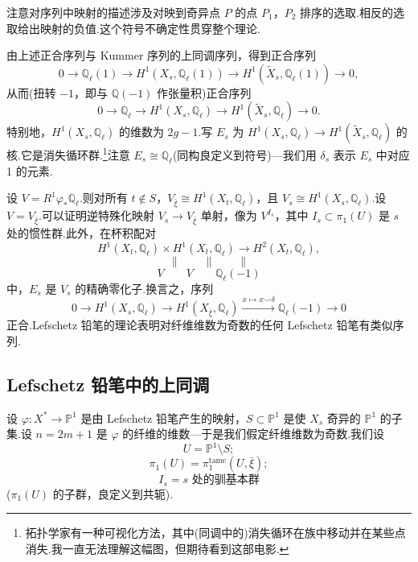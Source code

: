 注意对序列中映射的描述涉及对映到奇异点 $P$ 的点 $P_1$，$P_2$ 排序的选取.相反的选取给出映射的负值.这个符号不确定性贯穿整个理论.

由上述正合序列与 Kummer 序列的上同调序列，得到正合序列
\[
0 \to \mathbb{Q}_{\ell}(1) \to H^{1}(X_s, \mathbb{Q}_{\ell}(1)) \to H^{1}(\widetilde{X}_s, \mathbb{Q}_{\ell}(1)) \to 0,
\]
从而(扭转 $-1$，即与 $\mathbb{Q}(-1)$ 作张量积)正合序列
\[
0 \to \mathbb{Q}_{\ell} \to H^{1}(X_s, \mathbb{Q}_{\ell}) \to H^{1}(\widetilde{X}_s, \mathbb{Q}_{\ell}) \to 0.
\]
特别地，$H^{1}(X_s, \mathbb{Q}_{\ell})$ 的维数为 $2g - 1$.写 $E_s$ 为 $H^{1}(X_s, \mathbb{Q}_{\ell}) \to H^{1}(\widetilde{X}_s, \mathbb{Q}_{\ell})$ 的核.它是消失循环群.\footnote{拓扑学家有一种可视化方法，其中(同调中的)消失循环在族中移动并在某些点消失.我一直无法理解这幅图，但期待看到这部电影.}注意 $E_s \cong \mathbb{Q}_{\ell}$(同构良定义到符号)---我们用 $\delta_s$ 表示 $E_s$ 中对应 1 的元素.

设 $V = R^{1}\varphi_{*}\mathbb{Q}_{\ell}$.则对所有 $t \notin S$，$V_{\bar{\xi}} \cong H^{1}(X_t, \mathbb{Q}_{\ell})$，且 $V_s \cong H^{1}(X_s, \mathbb{Q}_{\ell})$.设 $V = V_{\bar{\xi}}$.可以证明逆特殊化映射 $V_s \to V_{\bar{\xi}}$ 单射，像为 $V^{I_s}$，其中 $I_s \subset \pi_1(U)$ 是 $s$ 处的惯性群.此外，在杯积配对
\[
H^{1}(X_t, \mathbb{Q}_{\ell}) \times H^{1}(X_t, \mathbb{Q}_{\ell}) \to H^{2}(X_t, \mathbb{Q}_{\ell}),
\]
\[
\parallel \qquad \parallel \qquad \parallel
\]
\[
V \qquad V \qquad \mathbb{Q}_{\ell}(-1)
\]
中，$E_s$ 是 $V_s$ 的精确零化子.换言之，序列
\[
0 \to H^{1}(X_s, \mathbb{Q}_{\ell}) \to H^{1}(X_{\bar{\xi}}, \mathbb{Q}_{\ell}) \xrightarrow{x \mapsto x \smile \delta} \mathbb{Q}_{\ell}(-1) \to 0
\]
正合.Lefschetz 铅笔的理论表明对纤维维数为奇数的任何 Lefschetz 铅笔有类似序列.

\subsection*{Lefschetz 铅笔中的上同调}

设 $\varphi \colon X^{*} \to \mathbb{P}^{1}$ 是由 Lefschetz 铅笔产生的映射，$S \subset \mathbb{P}^{1}$ 是使 $X_s$ 奇异的 $\mathbb{P}^{1}$ 的子集.设 $n = 2m + 1$ 是 $\varphi$ 的纤维的维数---于是我们假定纤维维数为奇数.我们设
\[
U = \mathbb{P}^{1} \setminus S;
\]
\[
\pi_1(U) = \pi^{\mathrm{tame}}_1(U, \bar{\xi});
\]
\[
I_s = s \text{ 处的驯基本群}
\]
($\pi_1(U)$ 的子群，良定义到共轭).

